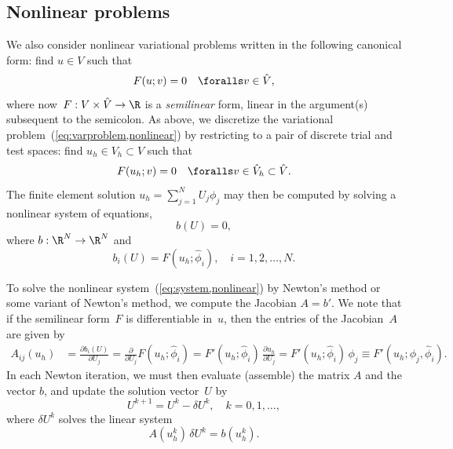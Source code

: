 \subsection{Nonlinear problems}
\label{sec:abstract,nonlinear}

We also consider nonlinear variational problems written in the
following canonical form: find $u \in V$ such that
\begin{equation} \label{eq:varproblem,nonlinear}
  F(u; v) = 0 \quad \foralls v \in \hat{V},
\end{equation}
where now~$F : V \times \hat{V} \rightarrow \R$ is a \emph{semilinear}
form, linear in the argument(s) subsequent to the semicolon. As above,
we discretize the variational problem~(\ref{eq:varproblem,nonlinear})
by restricting to a pair of discrete trial and test spaces: find $u_h
\in V_h \subset V$ such that
\begin{equation}
  F(u_h; v) = 0 \quad \foralls v \in \hat{V}_h \subset \hat{V}.
\end{equation}
The finite element solution $u_h = \sum_{j=1}^N U_j \phi_j$ may then
be computed by solving a nonlinear system of equations,
\begin{equation} \label{eq:system,nonlinear}
  b(U) = 0,
\end{equation}
where $b : \R^N \rightarrow \R^N$ and
\begin{equation}
  b_i(U) = F(u_h; \hat{\phi}_i), \quad i=1,2,\ldots,N.
\end{equation}

%
To solve the nonlinear system~(\ref{eq:system,nonlinear}) by Newton's
method or some variant of Newton's method, we compute the Jacobian $A
= b'$. We note that if the semilinear form~$F$ is differentiable
in~$u$, then the entries of the Jacobian~$A$ are given by
\begin{equation} \label{eq:jacobian}
  \begin{split}
    A_{ij}(u_h)
    &= \frac{\partial b_i(U)}{\partial U_j}
    = \frac{\partial}{\partial U_j} F(u_h; \hat{\phi}_i)
    = F'(u_h; \hat{\phi}_i) \, \frac{\partial u_h}{\partial U_j}
    = F'(u_h; \hat{\phi}_i) \, \phi_j
    \equiv F'(u_h; \phi_j, \hat{\phi}_i).
  \end{split}
\end{equation}
In each Newton iteration, we must then evaluate (assemble) the matrix
$A$ and the vector $b$, and update the solution vector~$U$ by
\begin{equation}
  U^{k+1} = U^k - \delta U^k, \quad k = 0,1,\ldots,
\end{equation}
where $\delta U^k$ solves the linear system
\begin{equation} \label{eq:system,linearization}
  A(u_h^k) \, \delta U^k = b(u_h^k).
\end{equation}

